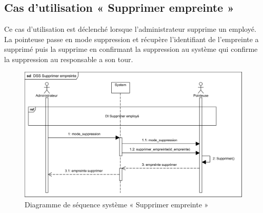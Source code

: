     \subsection*{Cas d'utilisation « Supprimer empreinte »}
    Ce cas d'utilisation est déclenché lorsque l'administrateur supprime un employé. La pointeuse passe en mode suppression et récupère l'identifiant de l'empreinte a supprimé puis la supprime en confirmant la suppression au système qui confirme la suppression au responsable a son tour.
    \clearpage
        \begin{figure}[h!]
             \centering
            \includegraphics[scale=0.95]{images/DSS/DSS Supprimer empreinte.png}
             \caption{Diagramme de séquence système « Supprimer empreinte »}
             \label{fig4}
        \end{figure}
    
    \clearpage